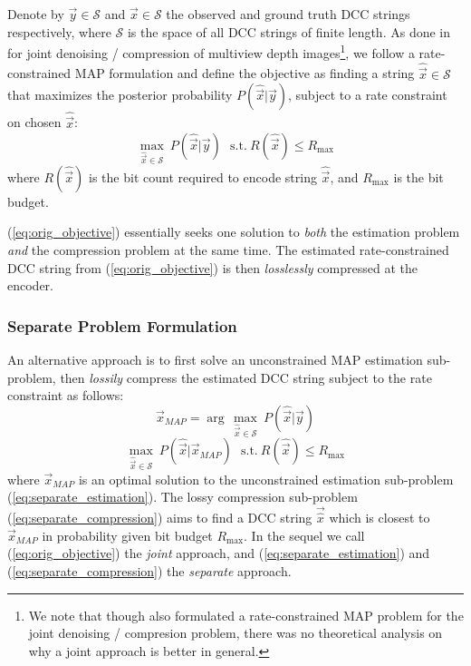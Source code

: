 Denote by $\vec{y} \in \mathcal{S}$ and $\vec{x} \in \mathcal{S}$ the observed and ground truth DCC strings respectively, where $\mathcal{S}$ is the space of all DCC strings of finite length. 
As done in \cite{sun13,sun14} for joint denoising / compression of multiview depth images\footnote{We note that though \cite{sun13,sun14} also formulated a rate-constrained MAP problem for the joint denoising / compresion problem, there was no theoretical analysis on why a joint approach is better in general.}, we follow a rate-constrained MAP formulation and define the objective as finding a string $\hat{\vec{x}} \in \mathcal{S}$ that maximizes the posterior probability $P(\hat{\vec{x}}|\vec{y})$, subject to a rate constraint on chosen $\hat{\vec{x}}$:
\begin{equation}
\label{eq:orig_objective}
\underset{\hat{\vec{x}}\in  \mathcal{S}}{\max}\ P(\hat{\vec{x}}|\vec{y}) ~~~ \mbox{s.t.} ~ 
R(\hat{\vec{x}})\leq  R_{\max}
\end{equation}
where $R(\hat{\vec{x}})$ is the bit count required to encode string $\hat{\vec{x}}$, and $R_{\max}$ is the bit budget. 

(\ref{eq:orig_objective}) essentially seeks one solution to \textit{both} the estimation problem \textit{and} the compression problem at the same time.
The estimated rate-constrained DCC string from (\ref{eq:orig_objective}) is then \textit{losslessly} compressed at the encoder.


\subsubsection{Separate Problem Formulation}

An alternative approach is to first solve an unconstrained MAP estimation sub-problem, then \textit{lossily} compress the estimated DCC string subject to the rate constraint as follows:
\begin{equation}
\vec{x}_{MAP} = \arg\,\underset{\hat{\vec{x}}\in  \mathcal{S}}{\max} \ P(\hat{\vec{x}}|\vec{y})
\label{eq:separate_estimation}
\end{equation} 
\begin{equation}
\underset{\hat{\vec{x}}\in  \mathcal{S}}{\max}\ P(\hat{\vec{x}}|\vec{x}_{MAP}) ~~~ \mbox{s.t.} ~ 
R(\hat{\vec{x}})\leq  R_{\max}
\label{eq:separate_compression}
\end{equation} 
where $\vec{x}_{MAP}$ is an optimal solution to the unconstrained estimation sub-problem (\ref{eq:separate_estimation}).
The lossy compression sub-problem (\ref{eq:separate_compression}) aims to find a DCC string $\vec{\hat{x}}$ which is closest to $\vec{x}_{MAP}$ in probability given bit budget $R_{\max}$.
In the sequel we call (\ref{eq:orig_objective}) the \textit{joint} approach, and (\ref{eq:separate_estimation}) and (\ref{eq:separate_compression}) the \textit{separate} approach.

